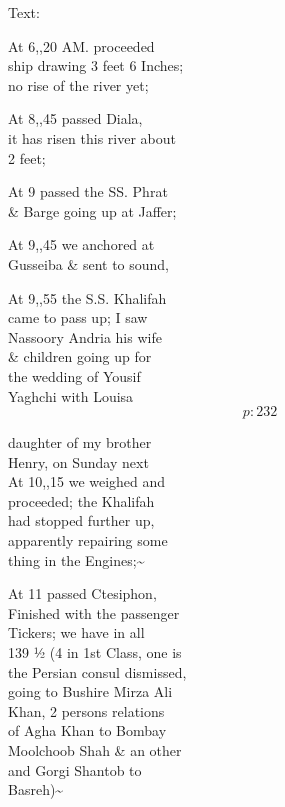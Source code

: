 \documentclass{report}
\begin{document}
	\par{
 	Text:\ \\
	}

	\par{
 	At 6,,20 AM. proceeded\ \\ship drawing 3 feet 6 Inches;\ \\no rise of the river yet;\ \\
	}

	\par{
 	At 8,,45 passed Diala,\ \\it has risen this river about\ \\2 feet;\ \\
	}

	\par{
 	At 9 passed the SS. Phrat\ \\\& Barge going up at Jaffer;\ \\
	}

	\par{
 	At 9,,45 we anchored at\ \\Gusseiba \& sent to sound,\ \\
	}

	\par{
 	At 9,,55 the S.S. Khalifah\ \\came to pass up; I saw\ \\Nassoory Andria his wife\ \\\& children going up for\ \\the wedding of Yousif\ \\Yaghchi with Louisa\ \\
  \[p: 232 \]

	}

	\par{
 	daughter of my brother\ \\Henry, on Sunday next\ \\At 10,,15 we weighed and\ \\proceeded; the Khalifah\ \\had stopped further up,\ \\apparently repairing some\ \\thing in the Engines;\~{}\ \\
	}

	\par{
 	At 11 passed Ctesiphon,\ \\Finished with the passenger\ \\Tickers; we have in all\ \\139 ½ (4 in 1st Class, one is\ \\the Persian consul dismissed,\ \\going to Bushire Mirza Ali\ \\Khan, 2 persons relations\ \\of Agha Khan to Bombay\ \\Moolchoob Shah \& an other\ \\and Gorgi Shantob to\ \\Basreh)\~{}\ \\
	}
\end{document}
